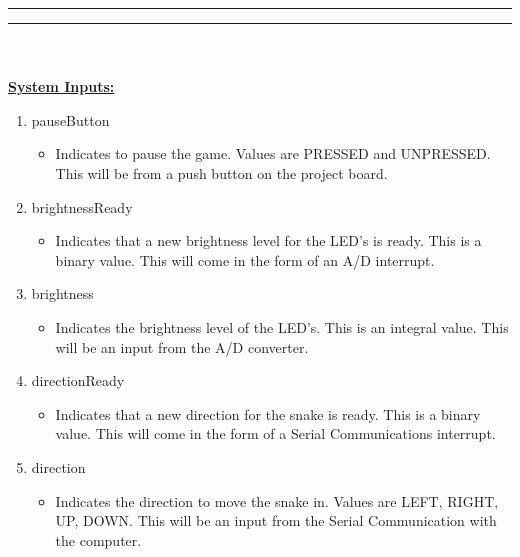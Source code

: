\documentclass[11pt]{article}
\newcommand{\question}[2] {
    \noindent \begin{minipage}{\textwidth}
        \vspace{.25in} \hrule\vspace{0.5em}
        \noindent{\bf #1: #2} \vspace{0.5em}
        \hrule \vspace{.10in}
    \end{minipage} \\ \\
}
\newcommand{\linespace} {\vspace{\baselineskip}}
\begin{document}
\question{Part 2}{Requirements}
    \textbf{\underline{System Inputs:}}
    \begin{enumerate}
        \item pauseButton
        \begin{itemize}[nolistsep, noitemsep, label=--]
            \item Indicates to pause the game. Values are PRESSED and UNPRESSED. This will be from a push button on
            the project board.
        \end{itemize}
        \item brightnessReady
        \begin{itemize}[nolistsep, noitemsep, label=--]
            \item Indicates that a new brightness level for the LED's is ready. This is a binary value. This will
            come in the form of an A/D interrupt.
        \end{itemize}
        \item brightness
        \begin{itemize}[nolistsep, noitemsep, label=--]
            \item Indicates the brightness level of the LED's. This is an integral value. This will be an input from
            the A/D converter.
        \end{itemize}
        \item directionReady
        \begin{itemize}[nolistsep, noitemsep, label=--]
            \item Indicates that a new direction for the snake is ready. This is a binary value.
            This will come in the form of a Serial Communications interrupt.
        \end{itemize}
        \item direction
        \begin{itemize}[nolistsep, noitemsep, label=--]
            \item Indicates the direction to move the snake in. Values are LEFT, RIGHT, UP, DOWN. This will
            be an input from the Serial Communication with the computer.
        \end{itemize}
    \end{enumerate} \linespace
\end{document}
